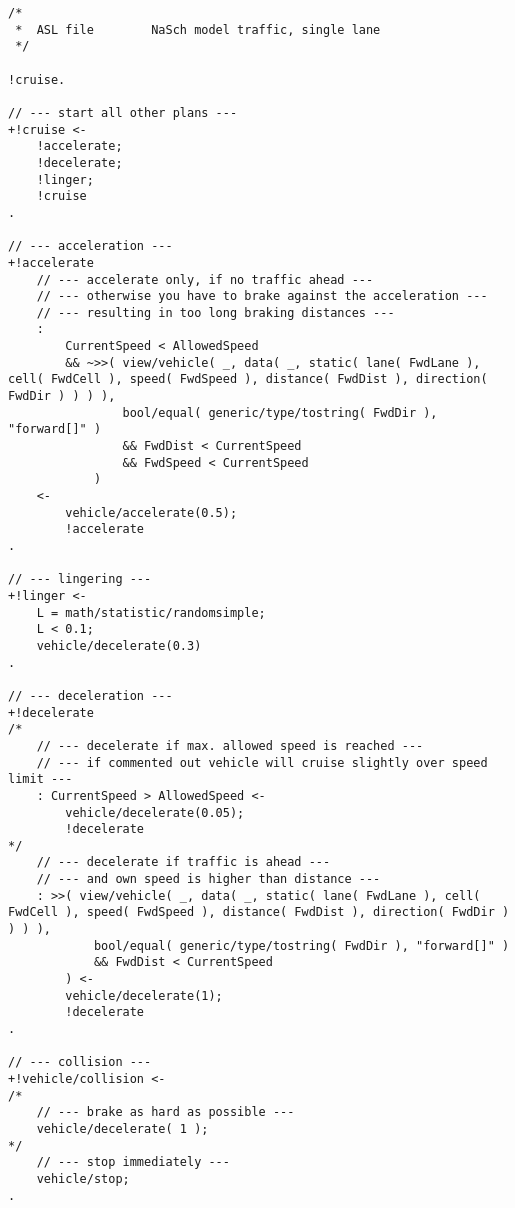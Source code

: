 \begin{lstlisting}[style=asl, 
                   keywords={+!cruise,+!accelerate,+!linger,+!decelerate,+!vehicle/collision}, 
                   keywords={[2]}, 
                   keywords={[3]}, 
                   caption={Agentenscript: NaSch-Modell, einspurig},
                   label={lst:nasch}]      
/*
 *  ASL file        NaSch model traffic, single lane
 */

!cruise.

// --- start all other plans ---
+!cruise <-
    !accelerate;
    !decelerate;
    !linger;
    !cruise
.

// --- acceleration ---
+!accelerate
    // --- accelerate only, if no traffic ahead ---
    // --- otherwise you have to brake against the acceleration ---
    // --- resulting in too long braking distances ---
    : 
        CurrentSpeed < AllowedSpeed
        && ~>>( view/vehicle( _, data( _, static( lane( FwdLane ), cell( FwdCell ), speed( FwdSpeed ), distance( FwdDist ), direction( FwdDir ) ) ) ),
                bool/equal( generic/type/tostring( FwdDir ), "forward[]" )
                && FwdDist < CurrentSpeed
                && FwdSpeed < CurrentSpeed
            )
    <-
        vehicle/accelerate(0.5);
        !accelerate
.

// --- lingering ---
+!linger <-
    L = math/statistic/randomsimple;
    L < 0.1;
    vehicle/decelerate(0.3)
.

// --- deceleration ---
+!decelerate 
/*
    // --- decelerate if max. allowed speed is reached ---
    // --- if commented out vehicle will cruise slightly over speed limit ---
    : CurrentSpeed > AllowedSpeed <-
        vehicle/decelerate(0.05);
        !decelerate
*/
    // --- decelerate if traffic is ahead ---
    // --- and own speed is higher than distance ---
    : >>( view/vehicle( _, data( _, static( lane( FwdLane ), cell( FwdCell ), speed( FwdSpeed ), distance( FwdDist ), direction( FwdDir ) ) ) ), 
            bool/equal( generic/type/tostring( FwdDir ), "forward[]" ) 
            && FwdDist < CurrentSpeed
        ) <-
        vehicle/decelerate(1);
        !decelerate
.

// --- collision ---
+!vehicle/collision <-
/*
    // --- brake as hard as possible ---
    vehicle/decelerate( 1 );
*/
    // --- stop immediately ---
    vehicle/stop;
.\end{lstlisting}


\newpage

